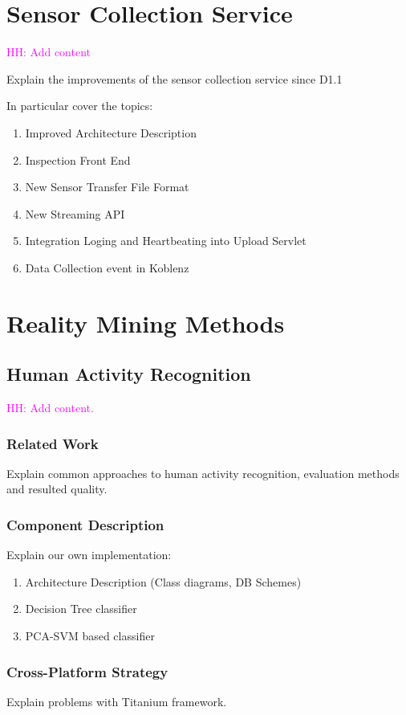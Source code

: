 \documentclass[external]{20120615_deliverable_template_ukob}
\theoremstyle{definition}
\newcommand{\todo}[2]{\textcolor{magenta}{#1: #2}}
\begin{document}
\clearpage
\chapter{Sensor Collection Service}
\todo{HH}{Add content}

Explain the improvements of the sensor collection service since D1.1

In particular cover the topics:
\begin{enumerate}
\item Improved Architecture Description
\item Inspection Front End
\item New Sensor Transfer File Format
\item New Streaming API
\item Integration Loging and Heartbeating into Upload Servlet
\item Data Collection event in Koblenz
\end{enumerate}

\chapter{Reality Mining Methods}

\section{Human Activity Recognition}
\todo{HH}{Add content.}

\subsection{Related Work}
Explain common approaches to human activity recognition, evaluation
methods and resulted quality.

\subsection{Component Description}
Explain our own implementation:

\begin{enumerate}
\item Architecture Description (Class diagrams, DB Schemes)
\item Decision Tree classifier
\item PCA-SVM based classifier
\end{enumerate}

\subsection{Cross-Platform Strategy}
Explain problems with Titanium framework.
\end{document}
